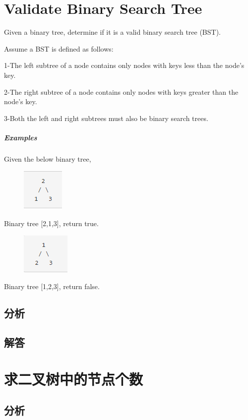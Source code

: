 \documentclass[UTF8,a4paper,12pt]{ctexbook}
\begin{document}
\section{Validate Binary Search Tree}
		Given a binary tree, determine if it is a valid binary search tree (BST).
		
		Assume a BST is defined as follows:
		
		1-The left subtree of a node contains only nodes with keys less than the node's key.
		
		2-The right subtree of a node contains only nodes with keys greater than the node's key.
		
		3-Both the left and right subtrees must also be binary search trees.
	\subparagraph{Examples}
		Given the below binary tree,
		
		\begin{figure}[h]
			\centering
			\includegraphics[scale = 1]{Tree_2.png}
		\end{figure}
		
		Binary tree [2,1,3], return true.
		
		\begin{figure}[h]
			\centering
			\includegraphics[scale = 1]{Tree_3.png}
		\end{figure}
		
		Binary tree [1,2,3], return false.
	\subsection{分析}
	
	\subsection{解答}
	
\section{求二叉树中的节点个数}
	\subsection{分析}
	
\end{document}
